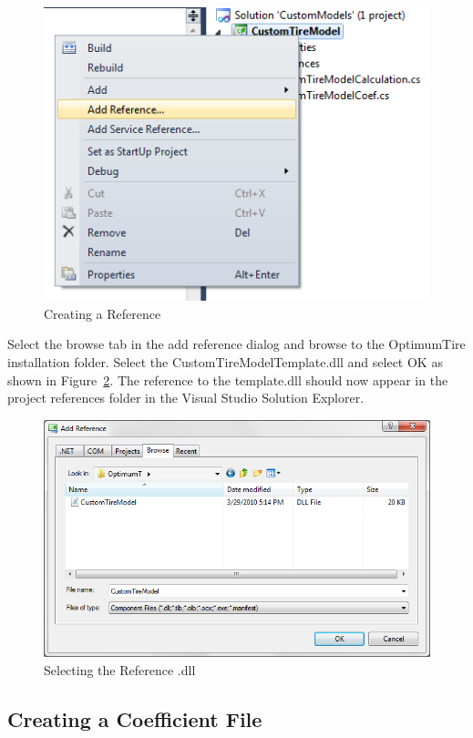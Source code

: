  \begin{figure}[H]
	\centering
		\includegraphics[height=0.3\textheight]{creatingReference.png}
	\caption{Creating a Reference}
	\label{fig:CreatingaReference}
\end{figure}

Select the browse tab in the add reference dialog and browse to the OptimumTire installation folder. Select the CustomTireModelTemplate.dll and select OK as shown in Figure~\ref{fig:SelectingtheReferencedll}. The reference to the template.dll should now appear in the project references folder in the Visual Studio Solution Explorer. 

 \begin{figure}[H]
	\centering
		\includegraphics[height=0.4\textheight]{SelectTemplate.png}
	\caption{Selecting the Reference .dll}
	\label{fig:SelectingtheReferencedll}
\end{figure}

\subsection{Creating a Coefficient File}
\label{sec:CreatingaCoefficientFile}

